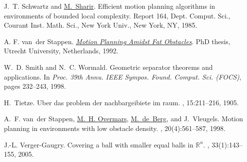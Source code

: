 \documentclass[12pt]{article}
\providecommand{\BibLatexMode}[1]{}
\renewcommand{\BibLatexMode}[1]{#1}
\theoremstyle{remark}\theoremheaderfont{\sf}\theorembodyfont{\upshape}
\numberwithin{figure}{section}\numberwithin{table}{section}\numberwithin{equation}{section}
\renewcommand{\Re}{{\mathbb{R}}}
\begin{document}
{\begin{thebibliography}{vdSOdBV98}
J.~T. Schwartz and \href{http://www.math.tau.ac.il/~michas}{M.~{Sharir}}.
\newblock  Efficient motion planning algorithms in environments of bounded
  local complexity.
\newblock Report 164, Dept. Comput. Sci., Courant Inst. Math. Sci., New York
  Univ., New York, NY, 1985.

{A. F. van~der} {Stappen}.
\newblock
  \href{http://www.staff.science.uu.nl/~stapp101/PhDThesis_AFvanderStappen.pdf}{{\em
  Motion Planning Amidst Fat Obstacles}}.
\newblock PhD thesis, Utrecht University, Netherlands, 1992.

W.~D. Smith and N.~C. Wormald.
\newblock  Geometric separator theorems and applications.
\newblock In {\em Proc. 39th Annu. IEEE Sympos. Found. Comput. Sci.
  {\em(FOCS)}}, pages 232--243, 1998.

H.~Tietze.
\newblock  Uber das problem der nachbargeibiete im raum.
, 15:211--216, 1905.

A.~F. van~der Stappen, \href{http://www.cs.uu.nl/people/markov/}{M.~H. {Overmars}}, \href{http://www.win.tue.nl/~mdberg/}{M.~de~{Berg}}, and J.~Vleugels.
\newblock  Motion planning in environments with low obstacle density.
, 20(4):561--587, 1998.

J.-L. {Verger-Gaugry}.
\newblock  Covering a ball with smaller equal balls in {$\Re^n$}.
, 33(1):143--155, 2005.

\end{thebibliography}

}

\BibLatexMode{\printbibliography}
\end{document}
